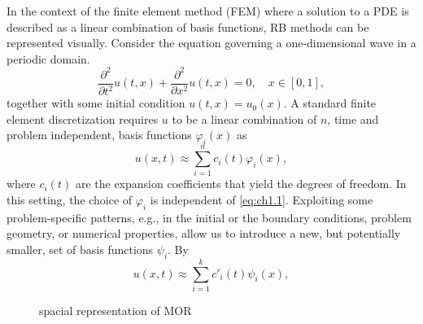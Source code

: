 In the context of the finite element method (FEM) where a solution to a PDE is described as a linear combination of basis functions, RB methods can be represented visually. Consider the equation governing a one-dimensional wave in a periodic domain.
\begin{equation} \label{eq:ch1.1}
	\frac{\partial^2 }{\partial t^2} u(t,x) + \frac{\partial^2 }{\partial x^2} u(t,x) = 0, \quad x\in[0,1],
\end{equation}
together with some initial condition $u(t,x) = u_0(x)$. A standard finite element discretization requires $u$ to be a linear combination of $n$, time and problem independent, basis functions $\varphi_i(x)$ as
\begin{equation} \label{eq:ch1.2}
	u(x,t) \approx \sum_{i=1}^n c_i(t) \varphi_i(x),
\end{equation}
where $c_i(t)$ are the expansion coefficients that yield the degrees of freedom. In this setting, the choice of $\varphi_i$ is independent of \eqref{eq:ch1.1}. Exploiting some problem-specific patterns, e.g., in the initial or the boundary conditions, problem geometry, or numerical properties, allow us to introduce a new, but potentially smaller, set of basis functions $\psi_i$. By
\begin{equation} \label{eq:ch1.3}
	u(x,t) \approx \sum_{i=1}^k c'_i(t) \psi_i(x),
\end{equation}
\begin{figure} [t]
	\caption{spacial representation of MOR}
	\label{fig:ch1.1}
\end{figure}
